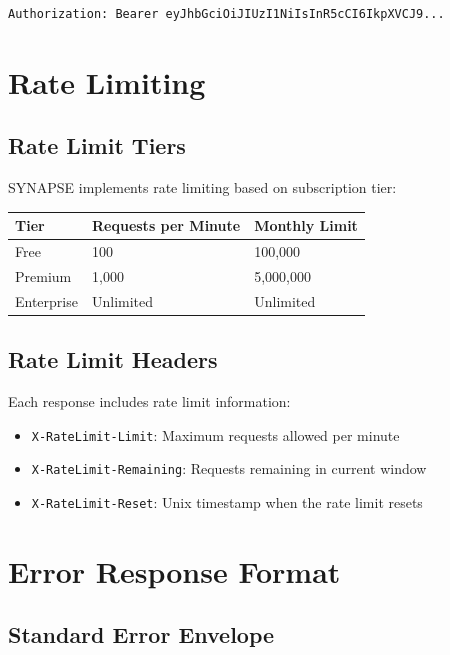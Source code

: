 \documentclass[12pt,a4paper]{report}
\begin{document}
\begin{lstlisting}
Authorization: Bearer eyJhbGciOiJIUzI1NiIsInR5cCI6IkpXVCJ9...
\end{lstlisting}

\chapter{Rate Limiting}

\section{Rate Limit Tiers}

SYNAPSE implements rate limiting based on subscription tier:

\begin{table}[H]
\centering
\begin{tabular}{lll}
\toprule
\textbf{Tier} & \textbf{Requests per Minute} & \textbf{Monthly Limit} \\
\midrule
Free & 100 & 100,000 \\
Premium & 1,000 & 5,000,000 \\
Enterprise & Unlimited & Unlimited \\
\bottomrule
\end{tabular}
\end{table}

\section{Rate Limit Headers}

Each response includes rate limit information:

\begin{itemize}
    \item \texttt{X-RateLimit-Limit}: Maximum requests allowed per minute
    \item \texttt{X-RateLimit-Remaining}: Requests remaining in current window
    \item \texttt{X-RateLimit-Reset}: Unix timestamp when the rate limit resets
\end{itemize}

\chapter{Error Response Format}

\section{Standard Error Envelope}
\end{document}
